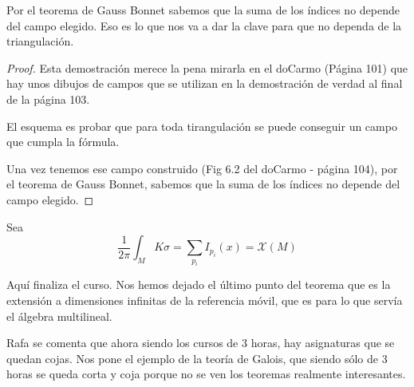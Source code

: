 Por el teorema de Gauss Bonnet sabemos que la suma de los índices no depende del campo elegido. Eso es lo que nos va a dar la clave para que no dependa de la triangulación.

\begin{proof}
Esta demostración merece la pena mirarla en el doCarmo (Página 101) que hay unos dibujos de campos que se utilizan en la demostración de verdad al final de la página 103.

El esquema es probar que para toda tirangulación se puede conseguir un campo que cumpla la fórmula.

Una vez tenemos ese campo construido (Fig 6.2 del doCarmo - página 104), por el teorema de Gauss Bonnet, sabemos que la suma de los índices no depende del campo elegido.

\end{proof}

\begin{theorem}
Sea
\[\frac{1}{2π} \int_M Kσ = \sum_{p_i} I_{p_i}(x) = \mathcal{X}(M)\]
\end{theorem}

Aquí finaliza el curso. Nos hemos dejado el último punto del teorema que es la extensión a dimensiones infinitas de la referencia móvil, que es para lo que servía el álgebra multilineal.

Rafa se comenta que ahora siendo los cursos de 3 horas, hay asignaturas  que se quedan cojas. Nos pone el ejemplo de la teoría de Galois, que siendo sólo de 3 horas se queda corta y coja porque no se ven los teoremas realmente interesantes.


